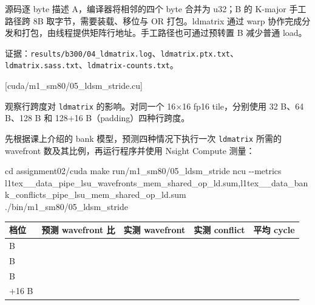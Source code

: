 \documentclass[11pt,a4paper,fontset=fandol]{ctexart}
\newenvironment{Shaded}{}{}
\newcommand{\AttributeTok}[1]{\textcolor[rgb]{0.49,0.56,0.16}{#1}}
\newcommand{\BuiltInTok}[1]{\textcolor[rgb]{0.00,0.50,0.00}{#1}}
\newcommand{\ExtensionTok}[1]{#1}
\newcommand{\FunctionTok}[1]{\textcolor[rgb]{0.02,0.16,0.49}{#1}}
\newcommand{\NormalTok}[1]{#1}
\begin{document}
\begin{answer}
源码逐 byte 描述 A，编译器将相邻的四个 byte 合并为 u32；B 的 K-major
手工路径跨 8B 取字节，需要装载、移位与 OR 打包。ldmatrix 通过 warp
协作完成分发和打包，由线程提供矩阵行地址。手工路径也可通过预转置 B
减少普通 load。

证据：\texttt{results/\allowbreak{}b300/\allowbreak{}04\_\allowbreak{}ldmatrix.\allowbreak{}log}、\texttt{ldmatrix.\allowbreak{}ptx.\allowbreak{}txt}、\texttt{ldmatrix.\allowbreak{}sass.\allowbreak{}txt}、\texttt{ldmatrix-\allowbreak{}counts.\allowbreak{}txt}。

\end{answer}

[cuda/m1\_sm80/05\_ldsm\_stride.cu]

观察行跨度对 \texttt{ldmatrix} 的影响。对同一个 16×16 fp16
tile，分别使用 32 B、64 B、128 B 和 128+16 B（padding）四种行跨度。

先根据课上介绍的 bank 模型，预测四种情况下执行一次 \texttt{ldmatrix}
所需的 wavefront 数及其比例，再运行程序并使用 Nsight Compute 测量：

\begin{Shaded}
\begin{Highlighting}[]
\BuiltInTok{cd}\NormalTok{ assignment02/cuda}
\FunctionTok{make}\NormalTok{ run/m1\_sm80/05\_ldsm\_stride}
\ExtensionTok{ncu} \AttributeTok{{-}{-}metrics}\NormalTok{ l1tex\_\_data\_pipe\_lsu\_wavefronts\_mem\_shared\_op\_ld.sum,l1tex\_\_data\_bank\_conflicts\_pipe\_lsu\_mem\_shared\_op\_ld.sum ./bin/m1\_sm80/05\_ldsm\_stride}
\end{Highlighting}
\end{Shaded}

\begin{longtable}[]{@{}
  >{\raggedright\arraybackslash}p{}
  >{\raggedright\arraybackslash}p{}
  >{\raggedright\arraybackslash}p{}
  >{\raggedright\arraybackslash}p{}
  >{\raggedright\arraybackslash}p{}@{}}
\toprule\noalign{}
\begin{minipage}[b]{\linewidth}\raggedright
档位
\end{minipage} & \begin{minipage}[b]{\linewidth}\raggedright
预测 wavefront 比
\end{minipage} & \begin{minipage}[b]{\linewidth}\raggedright
实测 wavefront
\end{minipage} & \begin{minipage}[b]{\linewidth}\raggedright
实测 conflict
\end{minipage} & \begin{minipage}[b]{\linewidth}\raggedright
平均 cycle
\end{minipage} \\
\midrule\noalign{}
\endhead
\bottomrule\noalign{}
\endlastfoot
32 B & & & & \\
64 B & & & & \\
128 B & & & & \\
128+16 B & & & & \\
\end{longtable}
\end{document}
